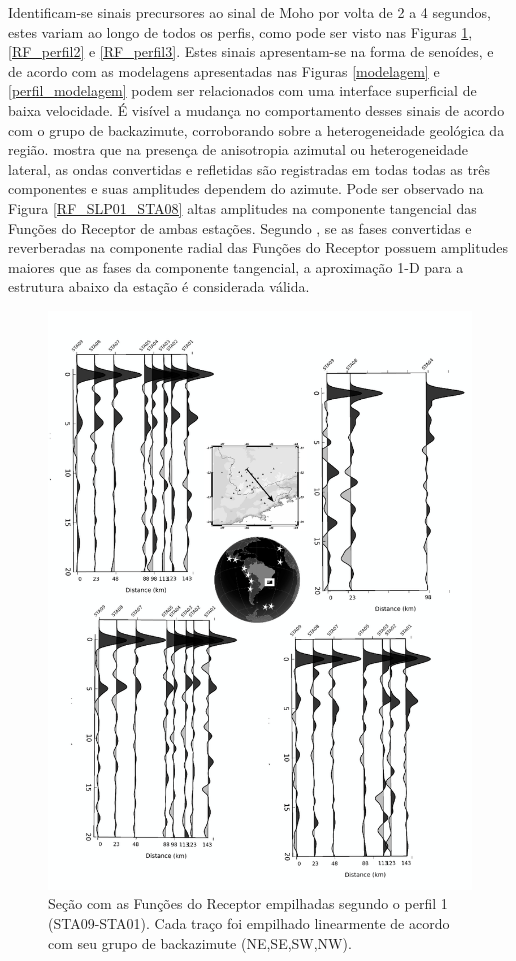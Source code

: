 Identificam-se sinais precursores ao sinal de Moho por volta de 2 a 4 segundos, estes variam ao longo de todos os perfis, como pode ser visto nas Figuras \ref{RF_perfil1}, \ref{RF_perfil2} e \ref{RF_perfil3}. Estes sinais apresentam-se na forma de senoídes, e de acordo com as modelagens apresentadas nas Figuras \ref{modelagem} e \ref{perfil_modelagem} podem ser relacionados com uma interface superficial de baixa velocidade. É visível a mudança no comportamento desses sinais de acordo com o grupo de backazimute, corroborando sobre a heterogeneidade geológica da região. \cite{vinnik_depth_2007} mostra que na presença de anisotropia azimutal ou heterogeneidade lateral, as ondas convertidas e refletidas são registradas em todas todas as três componentes e suas amplitudes dependem do azimute. Pode ser observado na Figura \ref{RF_SLP01_STA08} altas amplitudes na componente tangencial das Funções do Receptor de ambas estações. Segundo \cite{vinnik_depth_2007}, se as fases convertidas e reverberadas na componente radial das Funções do Receptor possuem amplitudes maiores que as fases da componente tangencial, a aproximação 1-D para a estrutura abaixo da estação é considerada válida.

\begin{figure}[!ht]
\centering
\includegraphics[scale=0.15]{Figs/RF_azimute_perfil1.png}
\caption{Seção com as Funções do Receptor empilhadas segundo o perfil 1 (STA09-STA01). Cada traço foi empilhado linearmente de acordo com seu grupo de backazimute (NE,SE,SW,NW).}
\label{RF_perfil1}
\end{figure}

